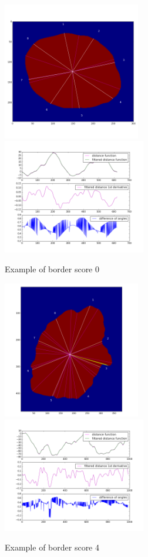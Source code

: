 \begin{figure}[H]
    \includegraphics[height=6cm,keepaspectratio]{assets/border/examples/border_0/border.png}
    \includegraphics[height=5cm,keepaspectratio]{assets/border/examples/border_0/figure_1.png}
    \caption{Example of border score 0}
    \label{fig:border_0}
\end{figure}
\begin{figure}[H]
    \includegraphics[height=6cm,keepaspectratio]{assets/border/examples/border_4/border.png}
    \includegraphics[height=5cm,keepaspectratio]{assets/border/examples/border_4/figure_1.png}
    \caption{Example of border score 4}
    \label{fig:border_4}
\end{figure}
